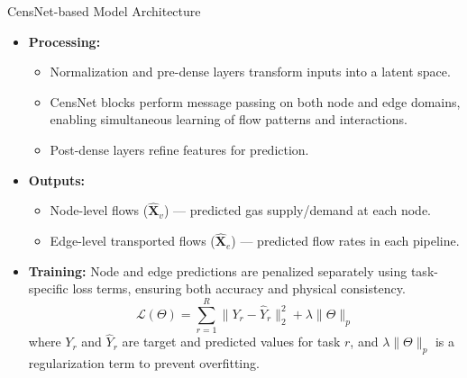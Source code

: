 \documentclass[hyperref={colorlinks,citecolor=blue,linkcolor=blue,urlcolor=blue}]{beamer}
\begin{document}
\begin{frame}{CensNet-based Model Architecture}   
\footnotesize
    \begin{itemize} 
        \item \textbf{Processing:}
        \begin{itemize}
            \item \footnotesize Normalization and pre-dense layers transform inputs into a latent space.
            \item \footnotesize CensNet blocks perform message passing on both node and edge domains, enabling simultaneous learning of flow patterns and interactions.
            \item \footnotesize Post-dense layers refine features for prediction.
        \end{itemize}
        
        \item \textbf{Outputs:}
        \begin{itemize}
            \item \footnotesize Node-level flows ($\hat{\mathbf{X}}_v$) — predicted gas supply/demand at each node.
            \item \footnotesize Edge-level transported flows ($\hat{\mathbf{X}}_e$) — predicted flow rates in each pipeline.
        \end{itemize}        
   \end{itemize}

    \begin{itemize} 
       \item \footnotesize \textbf{Training:} Node and edge predictions are penalized separately using task-specific loss terms, ensuring both accuracy and physical consistency.  
        \[
            \mathcal{L}(\Theta) = \sum_{r=1}^{R} \| Y_r - \hat{Y}_r \|^2_2 + \lambda \|\Theta\|_p
        \]
        where $Y_r$ and $\hat{Y}_r$ are target and predicted values for task $r$, and $\lambda\|\Theta\|_p$ is a regularization term to prevent overfitting.
    \end{itemize}
\end{frame}
\end{document}

